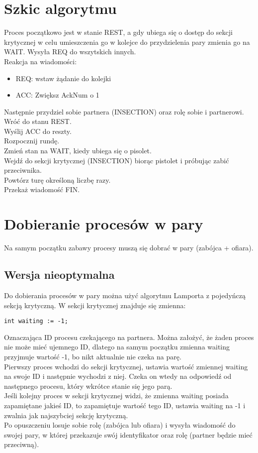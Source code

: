 \documentclass[11pt]{article}
\begin{document}
\section{Szkic algorytmu}
Proces początkowo jest w stanie REST, a gdy ubiega się o dostęp do sekcji krytycznej w celu umieszczenia go w kolejce do przydzielenia pary zmienia go na WAIT. Wysyła REQ do wszytskich innych.\\
Reakcja na wiadomości:
\begin{itemize}
    \item REQ: wstaw żądanie do kolejki
    \item ACC: Zwiększ AckNum o 1
\end{itemize}
Następnie przydziel sobie partnera (INSECTION) oraz rolę sobie i partnerowi.\\
Wróć do stanu REST.\\
Wyślij ACC do reszty.\\
Rozpocznij rundę.\\
Zmień stan na WAIT, kiedy ubiega się o pisolet.\\
Wejdź do sekcji krytycznej (INSECTION) biorąc pistolet i próbując zabić przeciwnika.\\
Powtórz turę określoną liczbę razy.\\
Przekaż wiadomość FIN.

\section{Dobieranie procesów w pary}
Na samym początku zabawy procesy muszą się dobrać w pary (zabójca + ofiara).
\subsection{Wersja nieoptymalna}
Do dobierania procesów w pary można użyć algorytmu Lamporta z pojedyńczą sekcją krytyczną. W sekcji krytycznej znajduje się zmienna:
\begin{Verbatim}
int waiting := -1;
\end{Verbatim}
Oznaczająca ID procesu czekającego na partnera. Można założyć, że żaden proces nie może mieć ujemnego ID, dlatego na samym początku zmienna waiting przyjmuje wartość -1, bo nikt aktualnie nie czeka na parę.\\
Pierwszy proces wchodzi do sekcji krytycznej, ustawia wartość zmiennej waiting na swoje ID i następnie wychodzi z niej. Czeka on wtedy na odpowiedź od następnego procesu, który wkrótce stanie się jego parą.\\
Jeśli kolejny proces w sekcji krytycznej widzi, że zmienna waiting posiada zapamiętane jakieś ID, to zapamiętuje wartość tego ID, ustawia waiting na -1 i zwalnia jak najszybciej sekcję krytyczną.\\
Po opuszczeniu losuje sobie rolę (zabójca lub ofiara) i wysyła wiadomość do swojej pary, w której przekazuje swój identyfikator oraz rolę (partner będzie mieć przeciwną).
\end{document}
